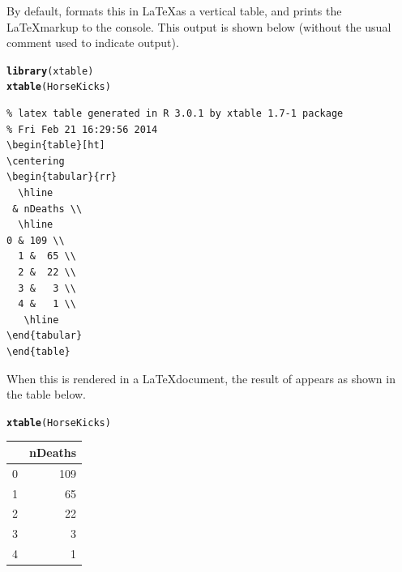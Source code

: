 \documentclass[11pt]{book}\usepackage[]{graphicx}\usepackage[]{color}
\makeatletter
\newcommand{\hlstd}[1]{\textcolor[rgb]{0.345,0.345,0.345}{#1}}%
\newcommand{\hlkwd}[1]{\textcolor[rgb]{0.737,0.353,0.396}{\textbf{#1}}}%
\newenvironment{kframe}{%
 \def\at@end@of@kframe{}%
 \ifinner\ifhmode%
  \def\at@end@of@kframe{\end{minipage}}%
  \begin{minipage}{\columnwidth}%
 \fi\fi%
 \def\FrameCommand##1{\hskip\@totalleftmargin \hskip-\fboxsep
 \colorbox{shadecolor}{##1}\hskip-\fboxsep
     \hskip-\linewidth \hskip-\@totalleftmargin \hskip\columnwidth}%
 \MakeFramed {\advance\hsize-\width
   \@totalleftmargin\z@ \linewidth\hsize
   \@setminipage}}%
 {\par\unskip\endMakeFramed%
 \at@end@of@kframe}
\newenvironment{knitrout}{}{} %
\renewenvironment{knitrout}{\small\renewcommand{\baselinestretch}{.85}}{} %
\makeatother
\begin{document}
By default,  formats this in \LaTeX as a vertical table,
and prints the \LaTeX markup to the \R console.  This output is shown
below (without the usual \code{\#\#} comment used to indicate \R output).
\begin{knitrout}
\color{fgcolor}\begin{kframe}
\begin{alltt}
\hlkwd{library}\hlstd{(xtable)}
\hlkwd{xtable}\hlstd{(HorseKicks)}
\end{alltt}
\begin{verbatim}
% latex table generated in R 3.0.1 by xtable 1.7-1 package
% Fri Feb 21 16:29:56 2014
\begin{table}[ht]
\centering
\begin{tabular}{rr}
  \hline
 & nDeaths \\ 
  \hline
0 & 109 \\ 
  1 &  65 \\ 
  2 &  22 \\ 
  3 &   3 \\ 
  4 &   1 \\ 
   \hline
\end{tabular}
\end{table}
\end{verbatim}
\end{kframe}
\end{knitrout}

When this is rendered in a \LaTeX document, the result of 
appears as shown in the table below.
\begin{kframe}
\begin{alltt}
\hlkwd{xtable}\hlstd{(HorseKicks)}
\end{alltt}
\end{kframe}%
\begin{table}[ht]
\centering
\begin{tabular}{rr}
  \hline
 & nDeaths \\ 
  \hline
0 & 109 \\ 
  1 &  65 \\ 
  2 &  22 \\ 
  3 &   3 \\ 
  4 &   1 \\ 
   \hline
\end{tabular}
\end{table}
\end{document}

